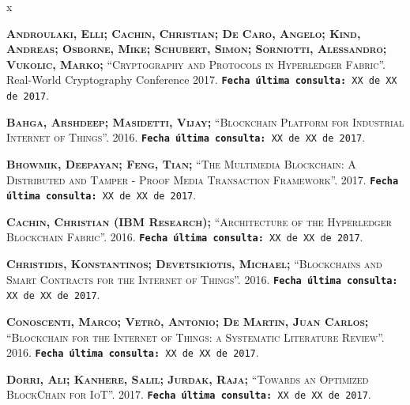 \documentclass[12pt,a4paper, twoside]{report}
\begin{document}
	\begin{thebibliography} {x}
	
		\pagestyle{empty}
		\thispagestyle{empty}

		\begingroup %
		\raggedright 
		\sloppy
	
		 \textsc{\textbf{Androulaki, Elli; Cachin, Christian; De Caro, Angelo; Kind, Andreas; Osborne, Mike; Schubert, Simon; Sorniotti, Alessandro; Vukolic, Marko; }}\textsc{“Cryptography and Protocols in Hyperledger Fabric”.} Real-World Cryptography Conference 2017.
		\newline \texttt{\textbf{Fecha última consulta:} XX de XX de 2017}.
		
		 \textsc{\textbf{Bahga, Arshdeep; Masidetti, Vijay; }}\textsc{“Blockchain Platform for Industrial Internet of Things”.} 2016.
		\newline \texttt{\textbf{Fecha última consulta:} XX de XX de 2017}.
	
		 \textsc{\textbf{Bhowmik, Deepayan; Feng, Tian; }}\textsc{“The Multimedia Blockchain: A Distributed and Tamper - Proof Media Transaction Framework”.} 2017.
		\newline \texttt{\textbf{Fecha última consulta:} XX de XX de 2017}.

		 \textsc{\textbf{Cachin, Christian (IBM Research); }}\textsc{“Architecture of the Hyperledger Blockchain Fabric”.} 2016. 
		\newline \texttt{\textbf{Fecha última consulta:} XX de XX de 2017}.
		
		 \textsc{\textbf{Christidis, Konstantinos; Devetsikiotis, Michael; }}\textsc{“Blockchains and Smart Contracts for the Internet of Things”.} 2016.
		\newline \texttt{\textbf{Fecha última consulta:} XX de XX de 2017}.

		 \textsc{\textbf{Conoscenti, Marco; Vetrò, Antonio; De Martin, Juan Carlos; }}\textsc{“Blockchain for the Internet of Things: a Systematic Literature Review”.} 2016.
		\newline \texttt{\textbf{Fecha última consulta:} XX de XX de 2017}.
		
		 \textsc{\textbf{Dorri, Ali; Kanhere, Salil; Jurdak, Raja; }}\textsc{“Towards an Optimized BlockChain for IoT”.} 2017.
		\newline \texttt{\textbf{Fecha última consulta:} XX de XX de 2017}.
		

\end{thebibliography}
\end{document}
